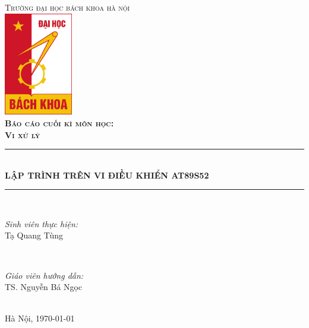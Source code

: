 \documentclass[../report.tex]{subfiles}
\begin{document}
\begin{titlepage}

\newcommand{\HRule}{\rule{\linewidth}{0.5mm}} %
\center
 
\textsc{\LARGE Trường đại học bách khoa hà nội}\\[1cm] %
\includegraphics[width=3cm]{figures/hust.jpg}\\[1cm] %
 
\textsc{\LARGE\bfseries Báo cáo cuối kì môn học:} \\[0.2cm]
\textsc{\huge\bfseries Vi xử lý}\\[1cm] %

\HRule \\[0.4cm]
{\LARGE\bfseries LẬP TRÌNH TRÊN VI ĐIỀU KHIỂN AT89S52}\\[0.3cm] %
\HRule \\[1.5cm]

\begin{minipage}{0.4\textwidth}
\begin{flushleft} \large
\emph{Sinh viên thực hiện:}\\
Tạ Quang Tùng
\end{flushleft}
\end{minipage}
~
\begin{minipage}{0.4\textwidth}
\begin{flushright} \large
\emph{Giáo viên hướng dẫn:} \\
TS. Nguyễn Bá Ngọc
\end{flushright}
\end{minipage}\\[2cm]

{\large Hà Nội, \today}\\[1cm] %

\vfill %

\end{titlepage}
\end{document}
